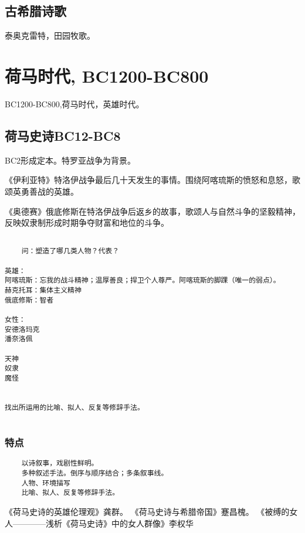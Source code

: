 \documentclass[UTF8]{../RepresentationUniverse}
\begin{document}
\subsection{古希腊诗歌}

泰奥克雷特，田园牧歌。


\section{荷马时代, BC1200-BC800}
BC1200-BC800,荷马时代，英雄时代。

\subsection{荷马史诗BC12-BC8}






BC2形成定本。特罗亚战争为背景。

《伊利亚特》特洛伊战争最后几十天发生的事情。围绕阿喀琉斯的愤怒和息怒，歌颂英勇善战的英雄。

《奥德赛》俄底修斯在特洛伊战争后返乡的故事，歌颂人与自然斗争的坚毅精神，反映奴隶制形成时期争夺财富和地位的斗争。




\begin{lstlisting}

    问：塑造了哪几类人物？代表？

英雄：
阿喀琉斯：忘我的战斗精神；温厚善良；捍卫个人尊严。阿喀琉斯的脚踝（唯一的弱点）。
赫克托耳：集体主义精神
俄底修斯：智者

女性：
安德洛玛克
潘奈洛佩

天神
奴隶
魔怪


找出所运用的比喻、拟人、反复等修辞手法。
    
\end{lstlisting}


\subsubsection{特点}
\begin{lstlisting}
    以诗叙事，戏剧性鲜明。
    多种叙述手法。倒序与顺序结合；多条叙事线。
    人物、环境描写
    比喻、拟人、反复等修辞手法。
\end{lstlisting}






《荷马史诗的英雄伦理观》龚群。
《荷马史诗与希腊帝国》蹇昌槐。
《被缚的女人————浅析《荷马史诗》中的女人群像》李权华
\end{document}
